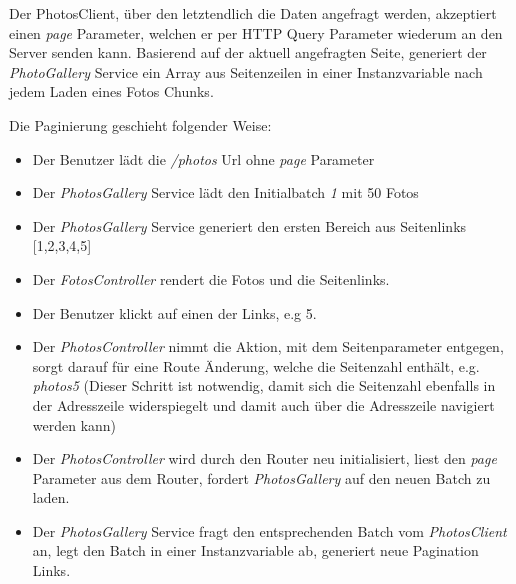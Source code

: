 Der PhotosClient, über den letztendlich die Daten angefragt werden, akzeptiert einen \textit{page} Parameter, welchen er per HTTP Query Parameter wiederum an den Server senden kann. Basierend auf der aktuell angefragten Seite, generiert der \textit{PhotoGallery} Service ein Array aus Seitenzeilen in einer Instanzvariable nach jedem Laden eines Fotos Chunks. 

Die Paginierung geschieht folgender Weise:

\begin{itemize}
  \item Der Benutzer lädt die \textit{/photos} Url ohne \textit{page} Parameter
  \item Der \textit{PhotosGallery} Service lädt den Initialbatch \textit{1} mit 50 Fotos 
  \item Der \textit{PhotosGallery} Service generiert den ersten Bereich aus Seitenlinks [1,2,3,4,5]
  \item Der \textit{FotosController} rendert die Fotos und die Seitenlinks.
  \item Der Benutzer klickt auf einen der Links, e.g 5.
  \item Der \textit{PhotosController} nimmt die Aktion, mit dem Seitenparameter entgegen, sorgt darauf für eine Route Änderung, welche die Seitenzahl enthält, e.g. \textit{\/photos\/5}
  (Dieser Schritt ist notwendig, damit sich die Seitenzahl ebenfalls in der Adresszeile widerspiegelt und damit auch über die Adresszeile navigiert werden kann)
  \item Der \textit{PhotosController} wird durch den Router neu initialisiert, liest den \textit{page} Parameter aus dem Router, fordert \textit{PhotosGallery} auf den neuen Batch zu laden.
  \item Der \textit{PhotosGallery} Service fragt den entsprechenden Batch vom \textit{PhotosClient} an, legt den Batch in einer Instanzvariable ab, generiert neue Pagination Links.
\end{itemize}

